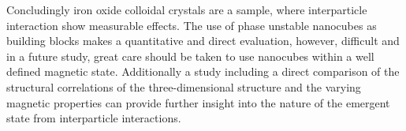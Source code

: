 \documentclass[\main/dresen_thesis.tex]{subfiles}
\begin{document}
  Concludingly iron oxide colloidal crystals are a sample, where interparticle interaction show measurable effects.
  The use of phase unstable nanocubes as building blocks makes a quantitative and direct evaluation, however, difficult and in a future study, great care should be taken to use nanocubes within a well defined magnetic state.
  Additionally a study including a direct comparison of the structural correlations of the three-dimensional structure and the varying magnetic properties can provide further insight into the nature of the emergent state from interparticle interactions.
\end{document}
